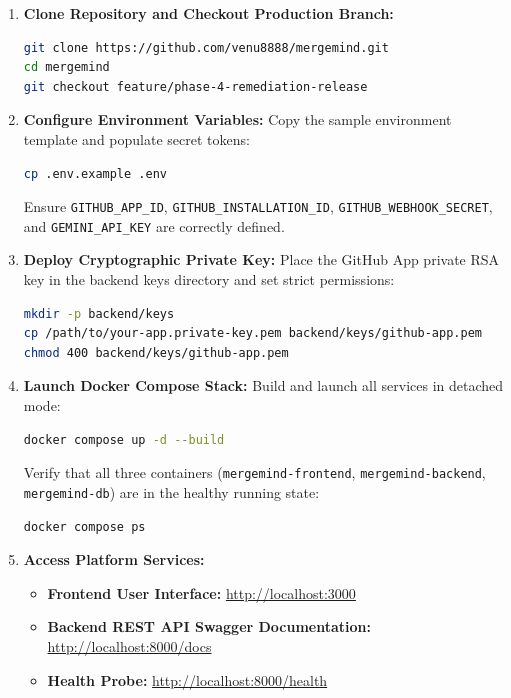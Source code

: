 \begin{enumerate}
    \item \textbf{Clone Repository and Checkout Production Branch:}
    \begin{lstlisting}[language=bash]
git clone https://github.com/venu8888/mergemind.git
cd mergemind
git checkout feature/phase-4-remediation-release
    \end{lstlisting}

    \item \textbf{Configure Environment Variables:}
    Copy the sample environment template and populate secret tokens:
    \begin{lstlisting}[language=bash]
cp .env.example .env
    \end{lstlisting}
    Ensure \texttt{GITHUB\_APP\_ID}, \texttt{GITHUB\_INSTALLATION\_ID}, \texttt{GITHUB\_WEBHOOK\_SECRET}, and \texttt{GEMINI\_API\_KEY} are correctly defined.

    \item \textbf{Deploy Cryptographic Private Key:}
    Place the GitHub App private RSA key in the backend keys directory and set strict permissions:
    \begin{lstlisting}[language=bash]
mkdir -p backend/keys
cp /path/to/your-app.private-key.pem backend/keys/github-app.pem
chmod 400 backend/keys/github-app.pem
    \end{lstlisting}

    \item \textbf{Launch Docker Compose Stack:}
    Build and launch all services in detached mode:
    \begin{lstlisting}[language=bash]
docker compose up -d --build
    \end{lstlisting}
    Verify that all three containers (\texttt{mergemind-frontend}, \texttt{mergemind-backend}, \texttt{mergemind-db}) are in the healthy running state:
    \begin{lstlisting}[language=bash]
docker compose ps
    \end{lstlisting}

    \item \textbf{Access Platform Services:}
    \begin{itemize}
        \item \textbf{Frontend User Interface:} \url{http://localhost:3000}
        \item \textbf{Backend REST API Swagger Documentation:} \url{http://localhost:8000/docs}
        \item \textbf{Health Probe:} \url{http://localhost:8000/health}
    \end{itemize}
\end{enumerate}

